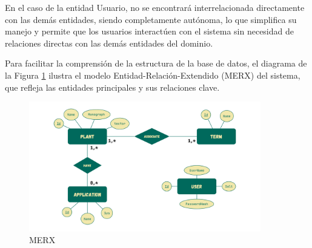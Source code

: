 En el caso de la entidad Usuario, no se encontrará interrelacionada directamente con las demás entidades, siendo completamente autónoma, lo que simplifica su manejo y permite 
que los usuarios interactúen con el sistema sin necesidad de relaciones directas con las demás entidades del dominio.

Para facilitar la comprensión de la estructura de la base de datos, el diagrama de la Figura \ref{fig:merx} ilustra el modelo Entidad-Relación-Extendido (MERX) del sistema, que refleja las entidades principales y sus relaciones clave.

\begin{figure}[ht!]
    \centering
    \includegraphics[width=0.9\textwidth]{Images/merx.png}
    \caption{MERX}
    \label{fig:merx}
\end{figure}
